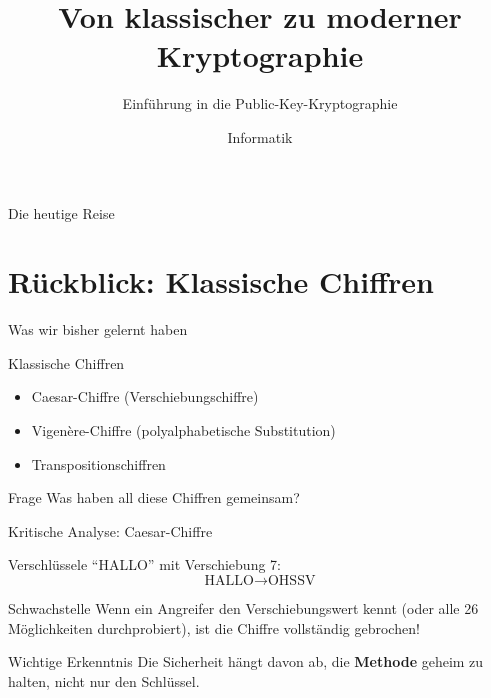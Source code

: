\documentclass[handout]{beamer}
\title{Von klassischer zu moderner Kryptographie}
\subtitle{Einführung in die Public-Key-Kryptographie}
\author{Informatik}
\date{}
\begin{document}
\frame{\titlepage}

\begin{frame}{Die heutige Reise}
\tableofcontents
\end{frame}

\section{Rückblick: Klassische Chiffren}

\begin{frame}{Was wir bisher gelernt haben}
\begin{block}{Klassische Chiffren}
\begin{itemize}
    \item Caesar-Chiffre (Verschiebungschiffre)
    \item Vigenère-Chiffre (polyalphabetische Substitution)
    \item Transpositionschiffren
\end{itemize}
\end{block}

\pause

\begin{alertblock}{Frage}
Was haben all diese Chiffren gemeinsam?
\end{alertblock}
\end{frame}

\begin{frame}{Kritische Analyse: Caesar-Chiffre}
\begin{example}
Verschlüssele ``HALLO'' mit Verschiebung 7:
\[
\text{HALLO} \rightarrow \text{OHSSV}
\]
\end{example}

\pause

\begin{alertblock}{Schwachstelle}
Wenn ein Angreifer den Verschiebungswert kennt (oder alle 26 Möglichkeiten durchprobiert), ist die Chiffre vollständig gebrochen!
\end{alertblock}

\pause

\begin{block}{Wichtige Erkenntnis}
Die Sicherheit hängt davon ab, die \textbf{Methode} geheim zu halten, nicht nur den Schlüssel.
\end{block}
\end{frame}
\end{document}
